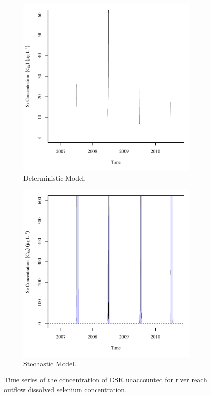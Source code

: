 \begin{linenumbers}
\begin{figure}[htbp]
\centering
	\begin{subfigure}{0.5\textwidth}
		\centering
		\includegraphics[width=0.9\linewidth]{"Figures/Results_DDSR/Balance Cout"}
		\caption{Deterministic Model.}
	\end{subfigure}%
	\begin{subfigure}{0.5\textwidth}
		\centering
		\includegraphics[width=0.9\linewidth]{"Figures/Results_DSR/Balance Cout"}
		\caption{Stochastic Model.}
	\end{subfigure}
	\caption[Time series of the concentration of DSR unaccounted for river reach outflow dissolved selenium concentration.]{Time series of the concentration of DSR unaccounted for river reach outflow dissolved selenium concentration.}
	\label{fig:DSRCout}
\end{figure}


\end{linenumbers}
